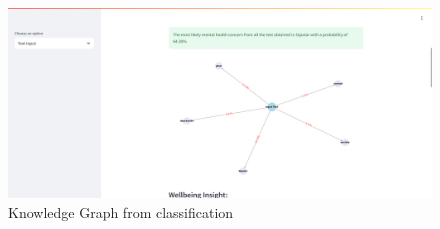 \begin{figure}[h!]  
    \centering
    \includegraphics[width=1.0\textwidth]{App Images/19 Interface.png}  
    \caption{Knowledge Graph from classification}
    \label{10i23445}  %
\end{figure}  


